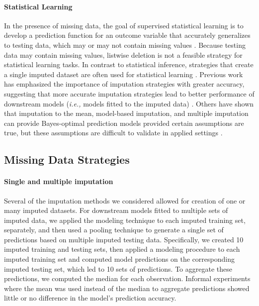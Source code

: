 \documentclass{article}
\begin{document}
\paragraph{Statistical Learning}

In the presence of missing data, the goal of supervised statistical
learning is to develop a prediction function for an outcome variable
that accurately generalizes to testing data, which may or may not
contain missing values \cite{hastie2009elements}. Because testing data
may contain missing values, listwise deletion is not a feasible strategy
for statistical learning tasks. In contrast to statistical inference,
strategies that create a single imputed dataset are often used for
statistical learning \cite{kuhn2019feature}. Previous work has
emphasized the importance of imputation strategies with greater
accuracy, suggesting that more accurate imputation strategies lead to
better performance of downstream models (\textit{i.e., }models fitted to
the imputed data) \cite{jerez2010missing}. Others have shown that
imputation to the mean, model-based imputation, and multiple imputation
can provide Bayes-optimal prediction models provided certain assumptions
are true, but these assumptions are difficult to validate in applied
settings \cite{josse2019consistency}.

\hypertarget{missing-data-strategies}{%
\subsection{Missing Data Strategies}\label{missing-data-strategies}}

\label{subsec:imputation}

\paragraph{Single and multiple imputation}

Several of the imputation methods we considered allowed for creation of
one or many imputed datasets. For downstream models fitted to multiple
sets of imputed data, we applied the modeling technique to each imputed
training set, separately, and then used a pooling technique to generate
a single set of predictions based on multiple imputed testing data.
Specifically, we created 10 imputed training and testing sets, then
applied a modeling procedure to each imputed training set and computed
model predictions on the corresponding imputed testing set, which led to
10 sets of predictions. To aggregate these predictions, we computed the
median for each observation. Informal experiments where the mean was
used instead of the median to aggregate predictions showed little or no
difference in the model's prediction accuracy.
\end{document}
